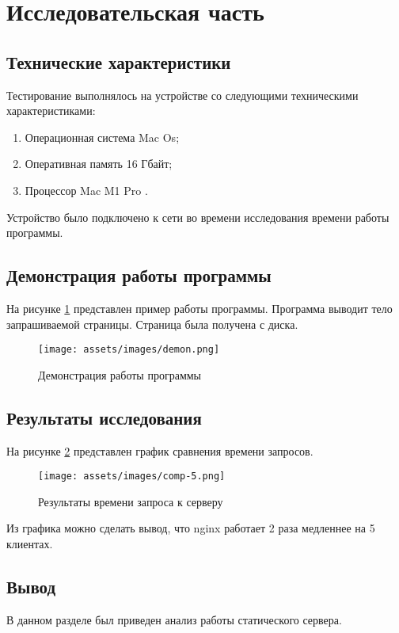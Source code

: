 \section{\large Исследовательская часть}

\subsection{Технические характеристики}

Тестирование выполнялось на устройстве со следующими техническими характеристиками:

\begin{enumerate}
	\item Операционная система Mac Os\cite{linux};
	\item Оперативная память 16 Гбайт;
	\item Процессор Mac M1 Pro \cite{amd}.
\end{enumerate}

Устройство было подключено к сети во времени исследования времени работы программы.

\subsection{Демонстрация работы программы}

На рисунке \ref{tasov:naydet:menya} представлен пример работы программы.
Программа выводит тело запрашиваемой страницы.
Страница была получена с диска.

\begin{figure}[ht!]
	\centering
		\texttt{[image: assets/images/demon.png]}
		\caption{Демонстрация работы программы}
		\label{tasov:naydet:menya}
\end{figure}
\FloatBarrier
\subsection{Результаты исследования}

На рисунке \ref{tasov:sec:menya} представлен график сравнения времени запросов.

\begin{figure}[ht!]
	\centering
		\texttt{[image: assets/images/comp-5.png]}
		\caption{Результаты времени запроса к серверу}
		\label{tasov:sec:menya}
\end{figure}

Из графика можно сделать вывод, что nginx работает 2 раза медленнее на 5 клиентах.

\subsection{Вывод}

В данном разделе был приведен анализ работы статического сервера.